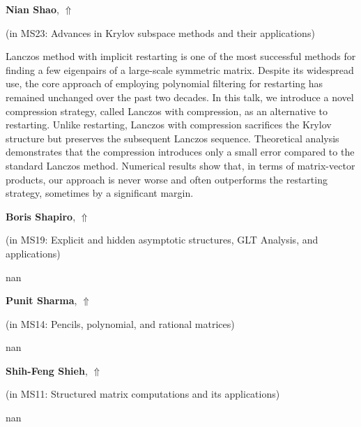 \documentclass[ILAS2025-program.tex]{subfiles}
\begin{document}
     \hypertarget{down0196}{}\begin{ilasabstract}
    
    \textbf{Nian Shao},  \hfill \hyperlink{up0196}{$\Uparrow$}
    
    (in {\color{mstitle}MS23: Advances in Krylov subspace methods and their applications})
        
        \mtskip
    Lanczos method with implicit restarting is one of the most successful methods for finding a few eigenpairs of a large-scale symmetric matrix.
Despite its widespread use, the core approach of employing polynomial filtering for restarting has remained unchanged over the past two decades.
In this talk, we introduce a novel compression strategy, called Lanczos with compression, as an alternative to restarting.
Unlike restarting, Lanczos with compression sacrifices the Krylov structure but preserves the subsequent Lanczos sequence.
Theoretical analysis demonstrates that the compression introduces only a small error compared to the standard Lanczos method.
Numerical results show that, in terms of matrix-vector products, our approach is never worse and often outperforms the restarting strategy, sometimes by a significant margin.
\end{ilasabstract}
     \hypertarget{down0219}{}\begin{ilasabstract}
    
    \textbf{Boris Shapiro},  \hfill \hyperlink{up0219}{$\Uparrow$}
    
    (in {\color{mstitle}MS19: Explicit and hidden asymptotic structures, GLT Analysis, and applications})
        
        \mtskip
    nan\end{ilasabstract}
     \hypertarget{down0371}{}\begin{ilasabstract}
    
    \textbf{Punit Sharma},  \hfill \hyperlink{up0371}{$\Uparrow$}
    
    (in {\color{mstitle}MS14: Pencils, polynomial, and rational matrices})
        
        \mtskip
    nan\end{ilasabstract}
     \hypertarget{down0234}{}\begin{ilasabstract}
    
    \textbf{Shih-Feng Shieh},  \hfill \hyperlink{up0234}{$\Uparrow$}
    
    (in {\color{mstitle}MS11: Structured matrix computations and its applications})
        
        \mtskip
    nan\end{ilasabstract}
\end{document}
